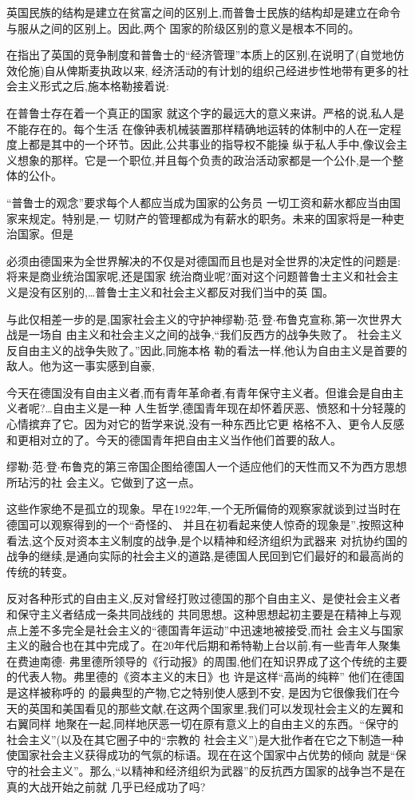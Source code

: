 ﻿\documentclass[12pt]{article}
\begin{document}
英国民族的结构是建立在贫富之间的区别上,而普鲁士民族的结构却是建立在命令与服从之间的区别上。因此,两个
国家的阶级区别的意义是根本不同的。

在指出了英国的竞争制度和普鲁士的``经济管理''本质上的区别,在说明了(自觉地仿效伦施)自从俾斯麦执政以来,
经济活动的有计划的组织己经进步性地带有更多的社会主义形式之后,施本格勒接着说:

在普鲁士存在着一个真正的国家 \myrule 就这个字的最远大的意义来讲。严格的说,私人是不能存在的。每个生活
在像钟表机械装置那样精确地运转的体制中的人在一定程度上都是其中的一个环节。因此,公共事业的指导权不能操
纵于私人手中,像议会主义想象的那样。它是一个职位,并且每个负责的政治活动家都是一个公仆,是一个整体的公仆。

``普鲁士的观念''要求每个人都应当成为国家的公务员 \myrule 一切工资和薪水都应当由国家来规定。特别是,一
切财产的管理都成为有薪水的职务。未来的国家将是一种吏治国家。但是

必须由德国来为全世界解决的不仅是对德国而且也是对全世界的决定性的问题是:将来是商业统治国家呢,还是国家
统治商业呢?面对这个问题普鲁士主义和社会主义是没有区别的,\ldots 普鲁士主义和社会主义都反对我们当中的英
国。

与此仅相差一步的是,国家社会主义的守护神缪勒$\cdot$范$\cdot$登$\cdot$布鲁克宣称,第一次世界大战是一场自
由主义和社会主义之间的战争,``我们反西方的战争失败了。 社会主义反自由主义的战争失败了。''因此,同施本格
勒的看法一样,他认为自由主义是首要的敌人。他为这一事实感到自豪,

今天在德国没有自由主义者,而有青年革命者,有青年保守主义者。但谁会是自由主义者呢?\ldots 自由主义是一种
人生哲学,德国青年现在却怀着厌恶、愤怒和十分轻蔑的心情摈弃了它。因为对它的哲学来说,没有一种东西比它更
格格不入、更令人反感和更相对立的了。今天的德国青年把自由主义当作他们首要的敌人。

缪勒$\cdot$范$\cdot$登$\cdot$布鲁克的第三帝国企图给德国人一个适应他们的天性而又不为西方思想所玷污的社
会主义。它做到了这一点。

这些作家绝不是孤立的现象。早在1922年,一个无所偏倚的观察家就谈到过当时在德国可以观察得到的一个``奇怪的、
并且在初看起来使人惊奇的现象是'',按照这种看法,这个反对资本主义制度的战争,是个以精神和经济组织为武器来
对抗协约国的战争的继续,是通向实际的社会主义的道路,是德国人民回到它们最好的和最高尚的传统的转变。

反对各种形式的自由主义,反对曾经打败过德国的那个自由主义、是使社会主义者和保守主义者结成一条共同战线的
共同思想。这种思想起初主要是在精神上与观点上差不多完全是社会主义的``德国青年运动''中迅速地被接受,而社
会主义与国家主义的融合也在其中完成了。在20年代后期和希特勒上台以前,有一些青年人聚集在费迪南德$\cdot$
弗里德所领导的《行动报》的周围,他们在知识界成了这个传统的主要的代表人物。弗里德的《资本主义的末日》也
许是这样``高尚的纯粹'' \myrule 他们在德国是这样被称呼的 \myrule 的最典型的产物,它之特别使人感到不安,
是因为它很像我们在今天的英国和美国看见的那些文献,在这两个国家里,我们可以发现社会主义的左翼和右翼同样
地聚在一起,同样地厌恶一切在原有意义上的自由主义的东西。``保守的社会主义''(以及在其它圈子中的``宗教的
社会主义'')是大批作者在它之下制造一种使国家社会主义获得成功的气氛的标语。现在在这个国家中占优势的倾向
就是``保守的社会主义''。那么,``以精神和经济组织为武器''的反抗西方国家的战争岂不是在真的大战开始之前就
几乎已经成功了吗?
\end{document}
